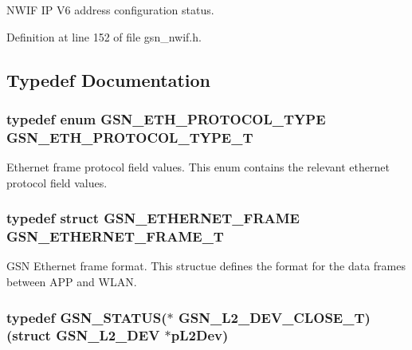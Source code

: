 NWIF IP V6 address configuration status. 



Definition at line 152 of file gsn\_\-nwif.h.



\subsection{Typedef Documentation}
\hypertarget{a00670_ga0144cadb46845e8150cdf57ae4a57ca5}{
\subsubsection[{GSN\_\-ETH\_\-PROTOCOL\_\-TYPE\_\-T}]{\setlength{\rightskip}{0pt plus 5cm}typedef enum {\bf GSN\_\-ETH\_\-PROTOCOL\_\-TYPE}  {\bf GSN\_\-ETH\_\-PROTOCOL\_\-TYPE\_\-T}}}
\label{a00670_ga0144cadb46845e8150cdf57ae4a57ca5}


Ethernet frame protocol field values. This enum contains the relevant ethernet protocol field values. 

\hypertarget{a00670_ga4c2283c8c30055ade4fd96a34a9110aa}{
\subsubsection[{GSN\_\-ETHERNET\_\-FRAME\_\-T}]{\setlength{\rightskip}{0pt plus 5cm}typedef struct {\bf GSN\_\-ETHERNET\_\-FRAME}  {\bf GSN\_\-ETHERNET\_\-FRAME\_\-T}}}
\label{a00670_ga4c2283c8c30055ade4fd96a34a9110aa}


GSN Ethernet frame format. This structue defines the format for the data frames between APP and WLAN. 

\hypertarget{a00670_ga76681abc89c36ea37c57cedb070f1ec2}{
\subsubsection[{GSN\_\-L2\_\-DEV\_\-CLOSE\_\-T}]{\setlength{\rightskip}{0pt plus 5cm}typedef {\bf GSN\_\-STATUS}($\ast$ {\bf GSN\_\-L2\_\-DEV\_\-CLOSE\_\-T})(struct {\bf GSN\_\-L2\_\-DEV} $\ast$pL2Dev)}}
\label{a00670_ga76681abc89c36ea37c57cedb070f1ec2}


